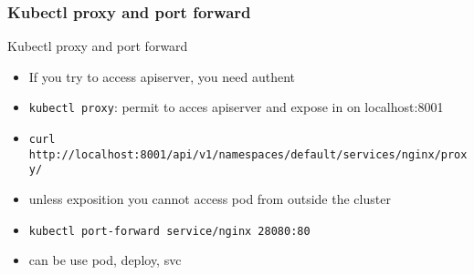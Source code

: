 \subsubsection{Kubectl proxy and port forward}
\begin{frame}[fragile]{Kubectl proxy and port forward}
  \begin{itemize}
  \item If you try to access apiserver, you need authent
  \item \texttt{kubectl proxy}: permit to acces apiserver and expose in on localhost:8001
  \item \texttt{curl http://localhost:8001/api/v1/namespaces/default/services/nginx/proxy/}
  \item unless exposition you cannot access pod from outside the cluster
  \item \texttt{kubectl port-forward service/nginx 28080:80}
  \item can be use pod, deploy, svc
  \end{itemize}
\end{frame}
